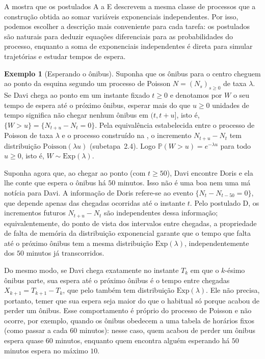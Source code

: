 \documentclass[12pt,portuguese]{article}
\theoremstyle{definition}
\newtheorem{example}[example]{Exemplo}
\theoremstyle{plainexercise}
\theoremstyle{starredexercise}
\theoremstyle{definition}
\begin{document}
A  mostra que os postulados A a E descrevem a mesma
classe de processos que a construção obtida ao somar variáveis exponenciais
independentes. Por isso, podemos escolher a descrição mais conveniente para
cada tarefa: os postulados são naturais para deduzir equações diferenciais para
as probabilidades do processo, enquanto a soma de exponenciais independentes é
direta para simular trajetórias e estudar tempos de espera.

\begin{example}[Esperando o ônibus]\label{ex:esperando-onibus}
Suponha que os ônibus para o centro cheguem ao ponto da esquina segundo um
processo de Poisson $N=(N_s)_{s\geqslant0}$ de taxa $\lambda$. Se Davi chega ao
ponto em um instante fixado $t\geqslant0$ e denotamos por $W$ o seu tempo de
espera até o próximo ônibus, esperar mais do que $u\geqslant0$ unidades de
tempo significa não chegar nenhum ônibus em $(t,t+u]$, isto é,
$\{W>u\}=\{N_{t+u}-N_t=0\}$. Pela equivalência estabelecida entre o processo de
Poisson de taxa $\lambda$ e o processo construído na ,
o incremento $N_{t+u}-N_t$ tem distribuição $\mathrm{Poisson}(\lambda u)$
(subetapa~2.4). Logo $\mathbb{P}(W>u)=e^{-\lambda u}$ para todo $u\geqslant0$,
isto é, $W\sim\mathrm{Exp}(\lambda)$.

Suponha agora que, ao chegar ao ponto (com $t\geqslant50$), Davi encontre Doris
e ela lhe conte que espera o ônibus há $50$ minutos. Isso não é uma boa nem uma
má notícia para Davi. A informação de Doris refere-se ao evento
$\{N_t-N_{t-50}=0\}$, que depende apenas das chegadas ocorridas até o instante
$t$. Pelo postulado D, os incrementos futuros $N_{t+u}-N_t$ são independentes
dessa informação; equivalentemente, do ponto de vista dos intervalos entre
chegadas, a propriedade de falta de memória da distribuição exponencial garante
que o tempo que falta até o próximo ônibus tem a mesma distribuição
$\mathrm{Exp}(\lambda)$, independentemente dos $50$ minutos já transcorridos.

Do mesmo modo, se Davi chega exatamente no instante $T_k$ em que o $k$-ésimo
ônibus parte, sua espera até o próximo ônibus é o tempo entre chegadas
$X_{k+1}=T_{k+1}-T_k$, que pelo  também tem
distribuição $\mathrm{Exp}(\lambda)$. Ele não precisa, portanto, temer que sua
espera seja maior do que o habitual só porque acabou de perder um ônibus. Esse
comportamento é próprio do processo de Poisson e não ocorre, por exemplo, quando
os ônibus obedecem a uma tabela de horários fixos (como passar a cada $60$
minutos): nesse caso, quem acabou de perder um ônibus espera quase $60$ minutos,
enquanto quem encontra alguém esperando há $50$ minutos espera no máximo $10$.
\end{example}
\end{document}
